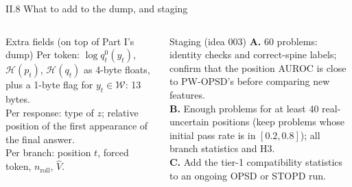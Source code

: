 \begin{frame}{II.8 What to add to the dump, and staging}
\begin{columns}[T]
\begin{block}{Extra fields (on top of Part I's dump)}
\footnotesize
Per token: $\log q^0_t(y_t)$, $\mathcal H(p_t)$, $\mathcal H(q_t)$ as 4-byte floats, plus a 1-byte flag for $y_t\in\mathcal W$: 13 bytes.\\[2pt]
Per response: type of $z$; relative position of the first appearance of the final answer.\\[2pt]
Per branch: position $t$, forced token, $n_{\mathrm{roll}}$, $\hat V$.
\end{block}
\begin{block}{Staging (idea 003)}
\footnotesize
\textbf{A.} 60 problems: identity checks and correct-spine labels; confirm that the position AUROC is close to PW-OPSD's before comparing new features.\\[2pt]
\textbf{B.} Enough problems for at least 40 real-uncertain positions (keep problems whose initial pass rate is in $[0.2,0.8]$); all branch statistics and H3.\\[2pt]
\textbf{C.} Add the tier-1 compatibility statistics to an ongoing OPSD or STOPD run.
\end{block}
\end{columns}
\end{frame}

